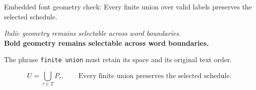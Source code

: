 \documentclass[11pt]{article}
\begin{document}
\noindent Embedded font geometry check: Every finite union over valid labels preserves the selected schedule.

\medskip
\textit{Italic geometry remains selectable across word boundaries.}\\
\textbf{Bold geometry remains selectable across word boundaries.}

\medskip
\noindent The phrase \texttt{finite union} must retain its space and its original text order.

\[
  U = \bigcup_{\tau \in T} P_{\tau}, \qquad
  \text{Every finite union preserves the selected schedule.}
\]
\end{document}
